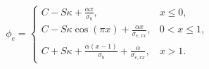 $$
\phi_e = \begin{cases}
C - S \kappa + \frac{\alpha x}{\sigma_b}, & x\le 0,\\
C - S \kappa \cos{\left(\pi x \right)} + \frac{\alpha x}{\sigma_{e,xx}}, & 0<x\le 1,\\
C + S \kappa + \frac{\alpha \left(x - 1\right)}{\sigma_b} + \frac{\alpha}{\sigma_{e,xx}}, & x>1.
\end{cases}
$$
